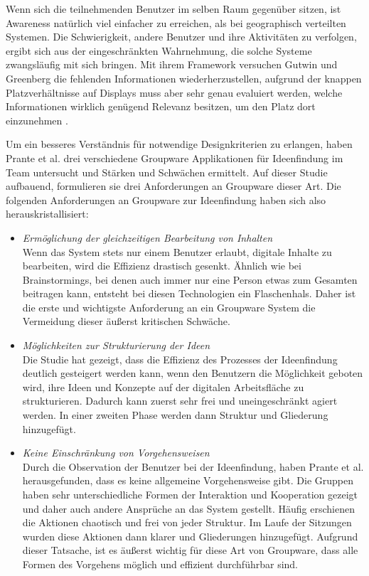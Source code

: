 Wenn sich die teilnehmenden Benutzer im selben Raum gegenüber sitzen, ist Awareness natürlich viel einfacher zu erreichen, als bei geographisch verteilten Systemen. Die Schwierigkeit, andere Benutzer und ihre Aktivitäten zu verfolgen, ergibt sich aus der eingeschränkten Wahrnehmung, die solche Systeme zwangsläufig mit sich bringen. Mit ihrem Framework versuchen Gutwin und Greenberg die fehlenden Informationen wiederherzustellen, aufgrund der knappen Platzverhältnisse auf Displays muss aber sehr genau evaluiert werden, welche Informationen wirklich genügend Relevanz besitzen, um den Platz dort einzunehmen \citep{Gutwin:1999}.

\medskip Um ein besseres Verständnis für notwendige Designkriterien zu erlangen, haben Prante et al. drei verschiedene Groupware Applikationen für Ideenfindung im Team untersucht und Stärken und Schwächen ermittelt. Auf dieser Studie aufbauend, formulieren sie drei Anforderungen an Groupware dieser Art. Die folgenden Anforderungen an Groupware zur Ideenfindung haben sich also herauskristallisiert:

\begin{itemize}
	\item{\emph{Ermöglichung der gleichzeitigen Bearbeitung von Inhalten} \\
		 Wenn das System stets nur einem Benutzer erlaubt, digitale Inhalte zu bearbeiten, wird die Effizienz drastisch gesenkt. Ähnlich wie bei Brainstormings, bei denen auch immer nur eine Person etwas zum Gesamten beitragen kann, entsteht bei diesen Technologien ein Flaschenhals. Daher ist die erste und wichtigste Anforderung an ein Groupware System die Vermeidung dieser äußerst kritischen Schwäche.
	}
	\item{\emph{Möglichkeiten zur Strukturierung der Ideen} \\
		Die Studie hat gezeigt, dass die Effizienz des Prozesses der Ideenfindung deutlich gesteigert werden kann, wenn den Benutzern die Möglichkeit geboten wird, ihre Ideen und Konzepte auf der digitalen Arbeitsfläche zu strukturieren. Dadurch kann zuerst sehr frei und uneingeschränkt agiert werden. In einer zweiten Phase werden dann Struktur und Gliederung hinzugefügt.
	}
	\item{\emph{Keine Einschränkung von Vorgehensweisen} \\
		Durch die Observation der Benutzer bei der Ideenfindung, haben Prante et al. herausgefunden, dass es keine allgemeine Vorgehensweise gibt. Die Gruppen haben sehr unterschiedliche Formen der Interaktion und Kooperation gezeigt und daher auch andere Ansprüche an das System gestellt. Häufig erschienen die Aktionen chaotisch und frei von jeder Struktur. Im Laufe der Sitzungen wurden diese Aktionen dann klarer und Gliederungen hinzugefügt. Aufgrund dieser Tatsache, ist es äußerst wichtig für diese Art von Groupware, dass alle Formen des Vorgehens möglich und effizient durchführbar sind. 
	}
\end{itemize}
\begin{flushright}
	 \citep{Prante:2002p86}
\end{flushright}


